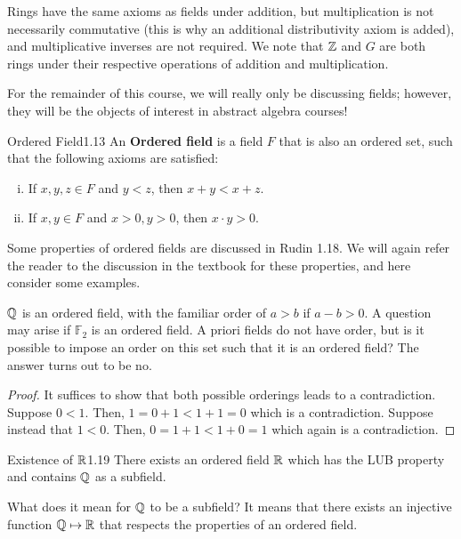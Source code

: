 \noindent Rings have the same axioms as fields under addition, but multiplication is not necessarily commutative (this is why an additional distributivity axiom is added), and multiplicative inverses are not required. We note that $\mathbb{Z}$ and $G$ are both rings under their respective operations of addition and multiplication. 

For the remainder of this course, we will really only be discussing fields; however, they will be the objects of interest in abstract algebra courses!

\setcounter{rudin}{16}
\begin{definition}{Ordered Field}{1.13}
    An \textbf{Ordered field} is a field $F$ that is also an ordered set, such that the following axioms are satisfied:
    \begin{enumerate}[(i)]
        \item If $x, y, z \in F$ and $y < z$, then $x + y < x + z$.
        \item If $x, y \in F$ and $x > 0, y > 0$, then $x\cdot y > 0$.
    \end{enumerate}
\end{definition}
\noindent Some properties of ordered fields are discussed in Rudin 1.18. We will again refer the reader to the discussion in the textbook for these properties, and here consider some examples.

$\mathbb{Q}$ is an ordered field, with the familiar order of $a > b$ if $a - b > 0$. A question may arise if $\mathbb{F}_2$ is an ordered field. A priori fields do not have order, but is it possible to impose an order on this set such that it is an ordered field? The answer turns out to be no.

\begin{proof}
    It suffices to show that both possible orderings leads to a contradiction. Suppose $0 < 1$. Then, $1 = 0 + 1 < 1 + 1 = 0$ which is a contradiction. Suppose instead that $1 < 0$. Then, $0 = 1 + 1 < 1 + 0 = 1$ which again is a contradiction.
\end{proof}


\begin{theorem}{Existence of $\mathbb{R}$}{1.19}
    There exists an ordered field $\mathbb{R}$ which has the LUB property and contains $\mathbb{Q}$ as a subfield. 
\end{theorem}
\noindent What does it mean for $\mathbb{Q}$ to be a subfield? It means that there exists an injective function $\mathbb{Q} \mapsto \mathbb{R}$ that respects the properties of an ordered field.

